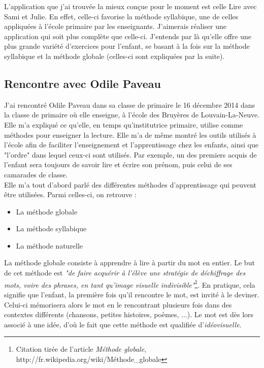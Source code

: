 L'application que j'ai trouvée la mieux conçue pour le moment est celle Lire avec Sami et Julie. En effet, celle-ci favorise la méthode syllabique, une de celles appliquées à l'école primaire par les enseignants. J'aimerais réaliser une application qui soit plus complète que celle-ci. J'entends par là qu'elle offre une plus grande variété d'exercices pour l'enfant, se basant à la fois sur la méthode syllabique et la méthode globale (celles-ci sont expliquées par la suite).

\subsection{Rencontre avec Odile Paveau\label{Freinet}}
J'ai rencontré Odile Paveau dans sa classe de primaire le 16 décembre 2014 dans la classe de primaire où elle enseigne, à l'école des Bruyères de Louvain-La-Neuve. \\

Elle m'a expliqué ce qu'elle, en temps qu'institutrice primaire, utilise comme méthodes pour enseigner la lecture. Elle m'a de même montré les outils utilisés à l'école afin de faciliter l'enseignement et l'apprentissage chez les enfants, ainsi que "l'ordre" dans lequel ceux-ci sont utilisés. Par exemple, un des premiers acquis de l'enfant sera toujours de savoir lire et écrire son prénom, puis celui de ses camarades de classe.\\

Elle m'a tout d'abord parlé des différentes méthodes d'apprentissage qui peuvent être utilisées. Parmi celles-ci, on retrouve :
\begin{itemize}
\item La méthode globale
\item La méthode syllabique
\item La méthode naturelle\\
\end{itemize}

La méthode globale consiste à apprendre à lire à partir du mot en entier. Le but de cet méthode est \textit{"de faire acquérir à l'élève une stratégie de déchiffrage des mots, voire des phrases, en tant qu'image visuelle indivisible"}\footnote{Citation tirée de l'article \textit{Méthode globale}, http://fr.wikipedia.org/wiki/Méthode\_globale}. En pratique, cela signifie que l'enfant, la première fois qu'il rencontre le mot, est invité à le deviner. Celui-ci mémorisera alors le mot en le rencontrant plusieurs fois dans des contextes différents (chansons, petites histoires, poèmes, ...). Le mot est dès lors associé à une idée, d'où le fait que cette méthode est qualifiée d'\textit{idéovisuelle}.\\

